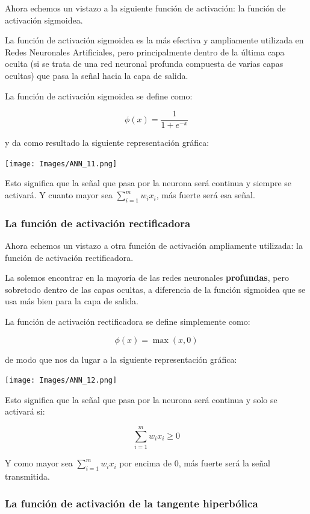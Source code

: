 \documentclass[
]{book}
\begin{document}
Ahora echemos un vistazo a la siguiente función de activación: la función de activación sigmoidea.

La función de activación sigmoidea es la más efectiva y ampliamente utilizada en Redes Neuronales Artificiales, pero principalmente dentro de la última capa oculta (si se trata de una red neuronal profunda compuesta de varias capas ocultas) que pasa la señal hacia la capa de salida.

La función de activación sigmoidea se define como:

\[\phi(x) = \frac{1}{1+e^{-x}}\]

y da como resultado la siguiente representación gráfica:

\texttt{[image: Images/ANN\_11.png]}

Esto significa que la señal que pasa por la neurona será continua y siempre se activará. Y cuanto mayor sea \(\sum_{i = 1}^m w_i x_i\), más fuerte será esa señal.

\hypertarget{la-funciuxf3n-de-activaciuxf3n-rectificadora}{%
\subsubsection{La función de activación rectificadora}\label{la-funciuxf3n-de-activaciuxf3n-rectificadora}}

Ahora echemos un vistazo a otra función de activación ampliamente utilizada: la función de activación rectificadora.

La solemos encontrar en la mayoría de las redes neuronales \textbf{profundas}, pero sobretodo dentro de las capas ocultas, a diferencia de la función sigmoidea que se usa más bien para la capa de salida.

La función de activación rectificadora se define simplemente como:

\[\phi(x) = \max(x,0)\]

de modo que nos da lugar a la siguiente representación gráfica:

\texttt{[image: Images/ANN\_12.png]}

Esto significa que la señal que pasa por la neurona será continua y solo se activará si:

\[\sum_{i=1}^m w_i x_i \ge 0\]

Y como mayor sea \(\sum_{i=1}^m w_i x_i\) por encima de 0, más fuerte será la señal transmitida.

\hypertarget{la-funciuxf3n-de-activaciuxf3n-de-la-tangente-hiperbuxf3lica}{%
\subsubsection{La función de activación de la tangente hiperbólica}\label{la-funciuxf3n-de-activaciuxf3n-de-la-tangente-hiperbuxf3lica}}
\end{document}
